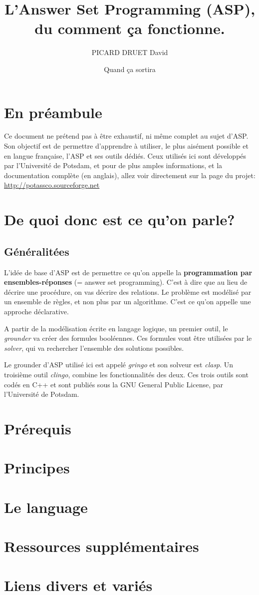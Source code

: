 \documentclass[12pt,a4paper,twoside]{article}
\author{PICARD DRUET David}
\title{L'Answer Set Programming (ASP), du comment ça fonctionne.}
\date{Quand ça sortira}
\begin{document}
\maketitle
\newpage
\tableofcontents
\newpage

\section{En préambule}
Ce document ne prétend pas à être exhaustif, ni même complet au sujet d'ASP. Son objectif est de permettre d'apprendre à utiliser, le plus aisément possible et en langue française, l'ASP et ses outils dédiés. Ceux utilisés ici sont développés par l'Université de Potsdam, et pour de plus amples informations, et la documentation complète (en anglais), allez voir directement sur la page du projet:
\url{http://potassco.sourceforge.net}


\section{De quoi donc est ce qu'on parle?}
\subsection{Généralitées}
L'idée de base d'ASP est de permettre ce qu'on appelle la \textbf{programmation par ensembles-réponses} (= answer set programming). C'est à dire que au lieu de décrire une procédure, on vas décrire des relations. Le problème est modélisé par un ensemble de règles, et non plus par un algorithme. C'est ce qu'on appelle une approche déclarative. 

A partir de la modélisation écrite en langage logique, un premier outil, le \textit{grounder} va créer des formules booléennes. Ces formules vont être utilisées par le \textit{solver}, qui va rechercher l'ensemble des solutions possibles.

Le grounder d'ASP utilisé ici est appelé \textit{gringo} et son solveur est \textit{clasp}. Un troisième outil \textit{clingo}, combine les fonctionnalités des deux. Ces trois outils sont codés en C++ et sont publiés sous la GNU General Public License, par l'Université de Potsdam.


\section{Prérequis}

\section{Principes}

\section{Le language}

\section{Ressources supplémentaires}

\section{Liens divers et variés}
\end{document}
